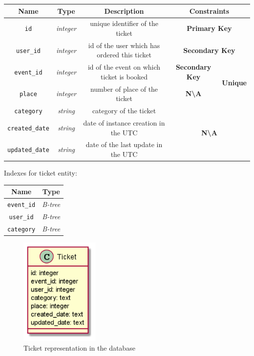 \begin{center}
    \begin{tabular}{ | c | c | c | c | c |}
        \hline
        \textbf{Name} & \textbf{Type} & \textbf{Description} & \multicolumn{2}{c|}{\textbf{Constraints}} \\ \hline
        \texttt{id} & \textit{integer} & unique identifier of the ticket & \multicolumn{2}{c|}{\textbf{\color{red}Primary Key}} \\ \hline
        \texttt{user\_id} & \textit{integer} & id of the user which has ordered this ticket & \multicolumn{2}{c|}{\textbf{\color{SecondaryKeyColor}Secondary Key}} \\ \hline
        \texttt{event\_id} & \textit{integer} & id of the event on which ticket is booked & \textbf{\color{SecondaryKeyColor}Secondary Key}  & \multirow{2}{*}{\textbf{\color{blue}Unique}} \\ \cline{0-3}
        \texttt{place}     & \textit{integer} & number of place of the ticket             & \textbf{N\textbackslash{A}}                                     &                                              \\ \hline
        \texttt{category} & \textit{string} & category of the ticket & \multicolumn{2}{c|}{\multirow{3}{*}{\textbf{N\textbackslash{A}}}} \\ \cline{0-2}
        \texttt{created\_date} & \textit{string} & date of instance creation in the UTC & \multicolumn{2}{c|}{} \\ \cline{0-2}
        \texttt{updated\_date} & \textit{string} & date of the last update in the UTC & \multicolumn{2}{c|}{} \\ \hline
    \end{tabular}
\end{center}

Indexes for ticket entity:

\begin{center}
    \begin{tabular}{ | c | c | }
        \hline
        \textbf{Name}  & \textbf{Type}   \\ \hline
        \texttt{event\_id}  & \textit{B-tree} \\ \hline
        \texttt{user\_id}  & \textit{B-tree} \\ \hline
        \texttt{category} & \textit{B-tree} \\ \hline
    \end{tabular}
\end{center}

\begin{figure}[h]
    \centering
    \includegraphics[width=0.35\textwidth]{images/ticket}
    \caption{Ticket representation in the database}
    \label{fig:ticket_db_1}
\end{figure}